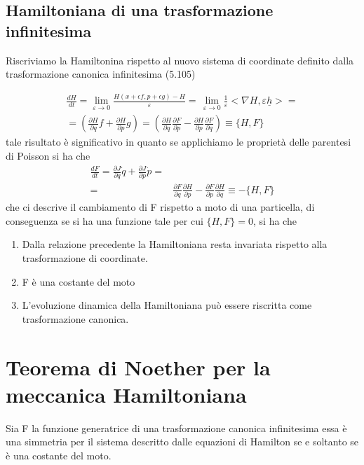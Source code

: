 \subsection{Hamiltoniana di una trasformazione infinitesima}

Riscriviamo la Hamiltonina rispetto al nuovo sistema di coordinate definito dalla trasformazione canonica infinitesima (5.105)

\begin{align*}
	\frac{dH}{dt}= \lim_{\varepsilon \rightarrow 0} \frac{H(x+\epsilon f, p+\epsilon g)-H}{\varepsilon}=\, \lim_{\varepsilon \rightarrow 0} \frac{1}{\varepsilon} <\nabla H,\varepsilon\underline{h}>
= \\[0.2in] =\left(\frac{\partial H}{\partial q} f +\frac{\partial H}{\partial p} g\right) 
= \left(\frac{\partial H}{\partial q}\frac{\partial F}{\partial p}  -\frac{\partial H}{\partial p}\frac{\partial F}{ \partial q} \right)\equiv \Big \{ H,F \Big \}
\end{align*}
tale risultato \`{e} significativo in quanto se applichiamo le propriet\`{a} delle parentesi di Poisson si ha che 
\begin{align*}
	\frac{dF}{dt} = \frac{\partial J}{\partial q} \dot{q}+\frac{\partial J}{\partial p} \dot{p} = & \\
	= &\frac{\partial F}{\partial q } \frac{\partial H}{\partial p}-\frac{\partial F}{\partial p} \frac{\partial H}{\partial q} \equiv - \Big \{H,F \Big \}
\end{align*}
che ci descrive il cambiamento di F rispetto a moto di una particella, di conseguenza se si ha una funzione tale per cui $\{H,F\} = 0$, si ha che
\begin{enumerate}
	\item Dalla relazione precedente la Hamiltoniana resta invariata rispetto alla trasformazione di coordinate.
	\item F \`{e} una costante del moto
	\item L'evoluzione dinamica della Hamiltoniana pu\`{o} essere riscritta come trasformazione canonica.
\end{enumerate}

\section{Teorema di Noether per la meccanica Hamiltoniana}

\begin{theorem}
	Sia F la funzione generatrice di una trasformazione canonica infinitesima essa \`{e} una simmetria per il sistema descritto dalle equazioni di Hamilton se e soltanto se \`{e} una costante del moto.
\end{theorem}

